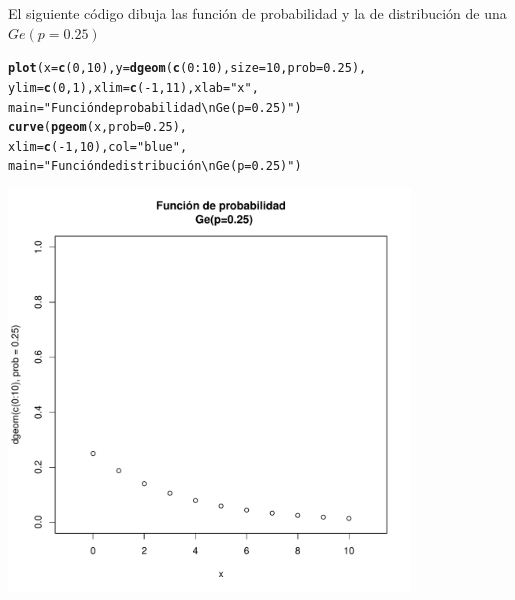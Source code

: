 \documentclass[handout]{beamer}\usepackage[]{graphicx}\usepackage[]{color}
\makeatletter
\newcommand{\hlnum}[1]{\textcolor[rgb]{0.686,0.059,0.569}{#1}}%
\newcommand{\hlstr}[1]{\textcolor[rgb]{0.192,0.494,0.8}{#1}}%
\newcommand{\hlopt}[1]{\textcolor[rgb]{0,0,0}{#1}}%
\newcommand{\hlstd}[1]{\textcolor[rgb]{0.345,0.345,0.345}{#1}}%
\newcommand{\hlkwc}[1]{\textcolor[rgb]{0.333,0.667,0.333}{#1}}%
\newcommand{\hlkwd}[1]{\textcolor[rgb]{0.737,0.353,0.396}{\textbf{#1}}}%
\newenvironment{kframe}{%
 \def\at@end@of@kframe{}%
 \ifinner\ifhmode%
  \def\at@end@of@kframe{\end{minipage}}%
  \begin{minipage}{\columnwidth}%
 \fi\fi%
 \def\FrameCommand##1{\hskip\@totalleftmargin \hskip-\fboxsep
 \colorbox{shadecolor}{##1}\hskip-\fboxsep
     \hskip-\linewidth \hskip-\@totalleftmargin \hskip\columnwidth}%
 \MakeFramed {\advance\hsize-\width
   \@totalleftmargin\z@ \linewidth\hsize
   \@setminipage}}%
 {\par\unskip\endMakeFramed%
 \at@end@of@kframe}
\newenvironment{knitrout}{}{} %
\theoremstyle{plain}
\theoremstyle{definition}
\makeatother
\begin{document}
\begin{frame}[fragile]

El siguiente código dibuja las función de probabilidad y la de distribución de una  $Ge(p=0.25)$

\begin{knitrout}
\color{fgcolor}\begin{kframe}
\begin{alltt}
\hlkwd{plot}\hlstd{(}\hlkwc{x}\hlstd{=}\hlkwd{c}\hlstd{(}\hlnum{0}\hlstd{,}\hlnum{10}\hlstd{),}\hlkwc{y}\hlstd{=}\hlkwd{dgeom}\hlstd{(}\hlkwd{c}\hlstd{(}\hlnum{0}\hlopt{:}\hlnum{10}\hlstd{),}\hlkwc{size}\hlstd{=}\hlnum{10}\hlstd{,}\hlkwc{prob}\hlstd{=}\hlnum{0.25}\hlstd{),}
  \hlkwc{ylim}\hlstd{=}\hlkwd{c}\hlstd{(}\hlnum{0}\hlstd{,}\hlnum{1}\hlstd{),}\hlkwc{xlim}\hlstd{=}\hlkwd{c}\hlstd{(}\hlopt{-}\hlnum{1}\hlstd{,}\hlnum{11}\hlstd{),}\hlkwc{xlab}\hlstd{=}\hlstr{"x"}\hlstd{,}
  \hlkwc{main}\hlstd{=}\hlstr{"Función de probabilidad\textbackslash{}n Ge(p=0.25)"}\hlstd{)}
\hlkwd{curve}\hlstd{(}\hlkwd{pgeom}\hlstd{(x,}\hlkwc{prob}\hlstd{=}\hlnum{0.25}\hlstd{),}
  \hlkwc{xlim}\hlstd{=}\hlkwd{c}\hlstd{(}\hlopt{-}\hlnum{1}\hlstd{,}\hlnum{10}\hlstd{),}\hlkwc{col}\hlstd{=}\hlstr{"blue"}\hlstd{,}
  \hlkwc{main}\hlstd{=}\hlstr{"Función de distribución\textbackslash{}n Ge(p=0.25)"}\hlstd{)}
\end{alltt}
\end{kframe}
\end{knitrout}

\end{frame}


\begin{frame}[fragile]

\begin{knitrout}
\color{fgcolor}
\includegraphics[width=0.8\textwidth]{figure/unnamed-chunk-8-1} 

\end{knitrout}

\end{frame}
\end{document}
